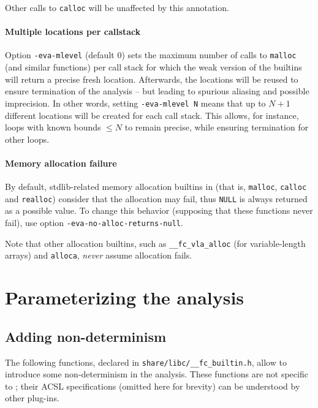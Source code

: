 \documentclass{frama-c-book}
\begin{document}
Other calls to \lstinline|calloc| will be unaffected by this annotation.

\paragraph{Multiple locations per callstack}

Option \lstinline|-eva-mlevel| (default 0) sets the maximum number of calls to
\lstinline|malloc| (and similar functions) per call stack for which the
weak version of the builtins will return a precise fresh location.
Afterwards, the locations will be reused to ensure termination of the analysis --
but leading to spurious aliasing and possible imprecision.
In other words, setting \lstinline|-eva-mlevel N| means that up to $N+1$
different locations will be created for each call stack. This allows,
for instance, loops with known bounds $\leq N$ to remain precise, while ensuring
termination for other loops.

\paragraph{Memory allocation failure}

By default, stdlib-related memory allocation builtins in \Eva{}
(that is, \lstinline|malloc|, \lstinline|calloc| and \lstinline|realloc|)
consider that
the allocation may fail, thus \lstinline|NULL| is always returned as a possible
value. To change this behavior (supposing that these functions never fail),
use option \lstinline|-eva-no-alloc-returns-null|.

Note that other allocation builtins, such as \lstinline|__fc_vla_alloc|
(for variable-length arrays) and \lstinline|alloca|, {\em never} assume
allocation fails.

\section{Parameterizing the analysis}

\subsection{Adding non-determinism}
\label{nondeterminism}

The following functions, declared in \lstinline|share/libc/__fc_builtin.h|, allow to
introduce some non-determinism in the analysis.
These functions are not specific to \Eva{}; their ACSL specifications
(omitted here for brevity) can be understood by other \FramaC plug-ins.
\end{document}
